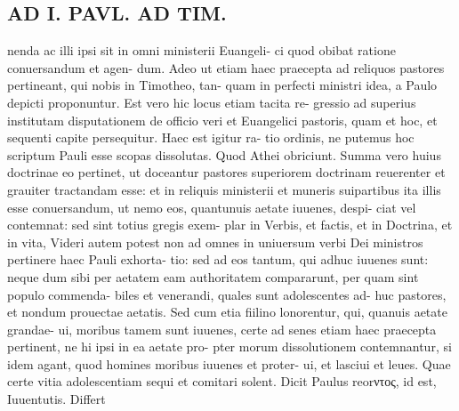 \documentclass{article}
\begin{document}
\begin{pages}
\section*{AD I. PAVL. AD TIM. }
\marginpar{[ p.228 ]}nenda ac illi ipsi sit in omni ministerii Euangeli- ci quod obibat ratione conuersandum et agen- dum. Adeo ut etiam haec praecepta ad reliquos pastores pertineant, qui nobis in Timotheo, tan- quam in perfecti ministri idea, a Paulo depicti proponuntur. Est vero hic locus etiam tacita re- gressio ad superius institutam disputationem de officio veri et Euangelici pastoris, quam et hoc, et sequenti capite persequitur. Haec est igitur ra- tio ordinis, ne putemus hoc scriptum Pauli esse scopas dissolutas. Quod Athei obriciunt. Summa vero huius doctrinae eo pertinet, ut doceantur pastores superiorem doctrinam reuerenter et grauiter tractandam esse: et in reliquis ministerii et muneris suipartibus ita illis esse conuersandum, ut nemo eos, quantunuis aetate iuuenes, despi- ciat vel contemnat: sed sint totius gregis exem- plar in Verbis, et factis, et in Doctrina, et in vita, Videri autem potest non ad omnes in uniuersum verbi Dei ministros pertinere haec Pauli exhorta- tio: sed ad eos tantum, qui adhuc iuuenes sunt: neque dum sibi per aetatem eam authoritatem compararunt, per quam sint populo commenda- biles et venerandi, quales sunt adolescentes ad- huc pastores, et nondum prouectae aetatis. Sed cum etia fiilino lonorentur, qui, quanuis aetate grandae- ui, moribus tamem sunt iuuenes, certe ad senes etiam haec praecepta pertinent, ne hi ipsi in ea aetate pro- pter morum dissolutionem contemnantur, si idem agant, quod homines moribus iuuenes et proter- ui, et lasciui et leues. Quae certe vitia adolescentiam sequi et comitari solent. Dicit Paulus reorντος, id est, Iuuentutis. Differt 

\end{pages}
\end{document}
